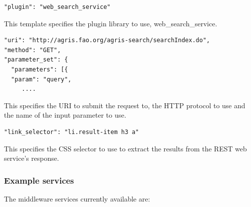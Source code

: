 \documentclass[9pt,a4paper]{extarticle}
\begin{document}
\begin{lstlisting}[style=json]
"plugin": "web_search_service"
\end{lstlisting}
This template specifies the plugin library to use, web\_search\_service.

\begin{lstlisting}[style=json]
"uri": "http://agris.fao.org/agris-search/searchIndex.do",
"method": "GET",
"parameter_set": {
  "parameters": [{
  "param": "query",
     ....
\end{lstlisting}
This specifies the URI to submit the request to, the HTTP protocol to use and the name of the input parameter to use.

\begin{lstlisting}[style=json]
"link_selector": "li.result-item h3 a"
\end{lstlisting}
This specifies the CSS selector to use to extract the results from the REST web service's response.

\subsubsection*{Example services}

The middleware services currently available are:
\end{document}
